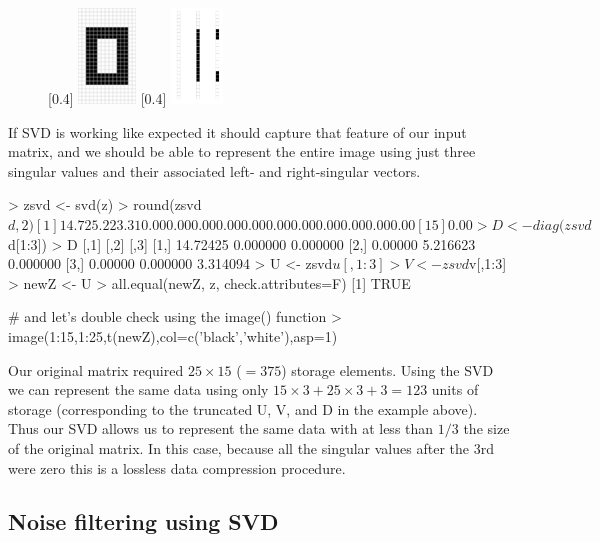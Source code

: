 \begin{figure}[ht!]
\begin{center}
[0.4\linewidth]{%
\includegraphics[height=1in]{./zero.jpg}%
}
[0.4\linewidth]{%
\includegraphics[height=1in]{./zero-vecs.jpg}%
}
\end{center}
\end{figure}

If SVD is working like expected it should capture that feature of our input matrix, and we should be able to represent the entire image using just three singular values and their associated left- and right-singular vectors.

\begin{R}
> zsvd <- svd(z)
> round(zsvd$d,2)
 [1] 14.72  5.22  3.31  0.00  0.00  0.00  0.00  0.00  0.00  0.00  0.00  0.00  0.00  0.00
[15]  0.00
> D <- diag(zsvd$d[1:3])
> D
         [,1]     [,2]     [,3]
[1,] 14.72425 0.000000 0.000000
[2,]  0.00000 5.216623 0.000000
[3,]  0.00000 0.000000 3.314094
> U <- zsvd$u[,1:3]
> V <- zsvd$v[,1:3]
> newZ <- U %
> all.equal(newZ, z, check.attributes=F)
[1] TRUE

# and let's double check using the image() function
> image(1:15,1:25,t(newZ),col=c('black','white'),asp=1)
\end{R}

Our original matrix required $25 \times 15$ ($= 375$) storage elements. Using the SVD we can represent the same data using only $15 \times 3 + 25 \times 3 + 3 = 123$ units of storage (corresponding to the truncated U, V, and D in the example above). Thus our SVD allows us to represent the same data with at less than $1/3$ the size of the original matrix. In this case, because all the singular values after the 3rd were zero this is a lossless data compression procedure.


\subsection{Noise filtering using SVD}

